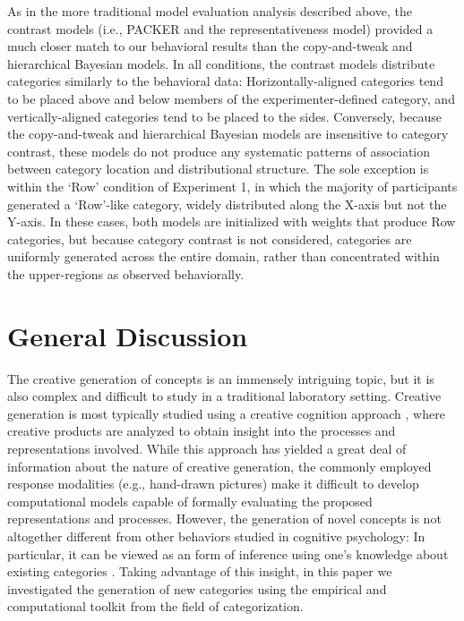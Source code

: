 \documentclass[12pt]{article}
\begin{document}
\begin{flushleft}
As in the more traditional model evaluation analysis described above, the
contrast models (i.e., PACKER and the representativeness model) provided a much
closer match to our behavioral results than the copy-and-tweak and hierarchical
Bayesian models. In all conditions, the contrast models distribute categories
similarly to the behavioral data: Horizontally-aligned categories tend to be
placed above and below members of the experimenter-defined category, and
vertically-aligned categories tend to be placed to the sides. Conversely,
because the copy-and-tweak and hierarchical Bayesian models are insensitive to
category contrast, these models do not produce any systematic patterns of
association between category location and distributional structure. The sole
exception is within the `Row' condition of Experiment 1, in which the majority
of participants generated a `Row'-like category, widely distributed along the
X-axis but not the Y-axis. In these cases, both models are initialized with
weights that produce Row categories, but because category contrast is not
considered, categories are uniformly generated across the entire domain, rather
than concentrated within the upper-regions as observed behaviorally.



\section{General Discussion}

The creative generation of concepts is an immensely intriguing topic, but it is
also complex and difficult to study in a traditional laboratory setting.
Creative generation is most typically studied using a creative cognition
approach \citep{finke1992creative,smith1995creative}, where creative products
\citep[such as drawings of alien plants and animals;][]{ward1994structured} are
analyzed to obtain insight into the processes and representations involved.
While this approach has yielded a great deal of information about the nature of
creative generation, the commonly employed response modalities (e.g., hand-drawn
pictures) make it difficult to develop computational models capable of formally
evaluating the proposed representations and processes. However, the generation
of novel concepts is not altogether different from other behaviors studied in
cognitive psychology: In particular, it can be viewed as an form of inference
using one's knowledge about existing categories
\citep{kemp2014taxonomy,kurtz2015human}. Taking advantage of this insight, in
this paper we investigated the generation of new categories using the empirical
and computational toolkit from the field of categorization.


\end{flushleft}
\end{document}
